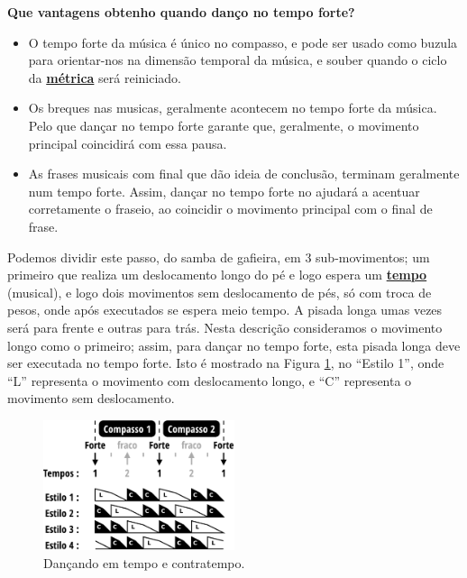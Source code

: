 \begin{tcbinformation} 
\label{ref:beneficiosdancarforte}
\textbf{Que vantagens obtenho quando danço no tempo forte?}
\begin{itemize}
\item O tempo forte da música é único no compasso, 
e pode ser usado como buzula para orientar-nos na dimensão temporal da música, 
e souber quando o ciclo da \hyperref[def:Metrica]{\textbf{métrica}} será reiniciado.
\item Os breques nas musicas, geralmente acontecem no tempo forte da música.
Pelo que dançar no tempo forte garante que, geralmente, 
o movimento principal coincidirá com essa pausa.
\item As frases musicais com final que dão ideia de conclusão,
terminam geralmente num tempo forte.
Assim, dançar no tempo forte no ajudará a acentuar corretamente o fraseio,
ao coincidir o movimento principal com o final de frase. 
\end{itemize}
\end{tcbinformation} 

\begin{example}
\label{ex:frentetrasex}
Podemos dividir este passo, do samba de gafieira, em 3 sub-movimentos; 
um primeiro que realiza um deslocamento longo do pé e logo espera um \hyperref[sec:Tempo]{\textbf{tempo}} (musical),
e logo dois movimentos sem deslocamento de pés, só com troca de pesos,
 onde após executados se espera meio tempo. 
A pisada longa umas vezes será para frente e outras para trás. 
Nesta descrição consideramos o movimento longo como o primeiro;
assim, para dançar no tempo forte, esta pisada longa deve ser executada no tempo forte.
Isto é mostrado na Figura \ref{fig:tempovscontratempo}, no ``Estilo 1'',
onde ``L'' representa o movimento com deslocamento longo,
e ``C'' representa o movimento sem deslocamento.
\end{example}


\begin{figure}[h]
    \centering 
\includegraphics[width=0.5\textwidth]{chapters/cap-musicalidade/bailarcontratempo.eps}
    \caption{Dançando em tempo e contratempo.}\label{fig:tempovscontratempo}
\end{figure}




